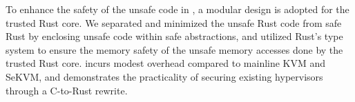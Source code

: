 \begin{abstract*}
To enhance the safety of the unsafe code in \rustsec{},
a modular design is adopted for the trusted Rust core. We separated and
minimized the unsafe Rust code from safe Rust by enclosing unsafe code within
safe abstractions, and utilized Rust's type system to ensure the memory safety
of the unsafe memory accesses done by the trusted Rust core.
\rustsec{} incurs modest overhead compared to mainline KVM and SeKVM, and
demonstrates the practicality of securing existing hypervisors through a
C-to-Rust rewrite.

\end{abstract*}
